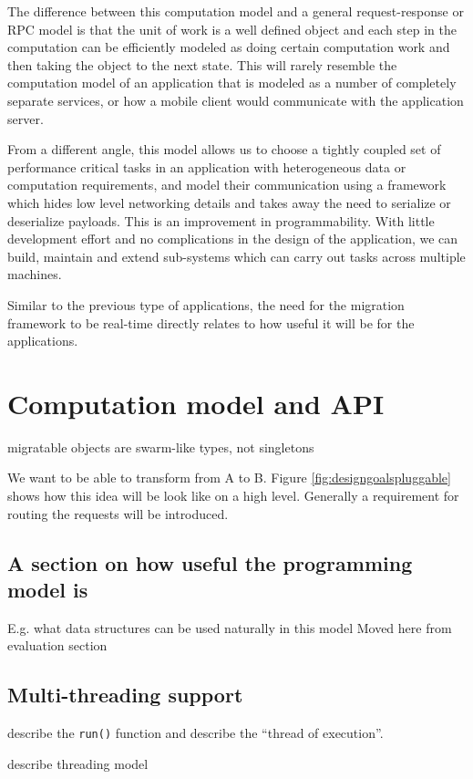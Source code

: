 The difference between this computation model and a general
request-response or RPC model is that the unit of work is a
well defined object and each step in the computation can be
efficiently modeled as doing certain computation work and then taking
the object to the next state. This will rarely resemble the computation
model of an application that is modeled as a number of completely separate
services, or how a mobile client would communicate with the application
server.

From a different angle, this model allows us to choose a tightly
coupled set of performance critical tasks in an application with
heterogeneous data or computation requirements, and model their
communication using a framework which hides low level networking details
and takes away the need to serialize or deserialize payloads.
This is an improvement in programmability. With little development
effort and no complications in the design of the application,
we can build, maintain and
extend sub-systems which can carry out tasks across multiple machines.

Similar to the previous type of applications, the need for the migration
framework to be real-time directly relates to how useful it will be for
the applications.


\section{Computation model and API}
\label{sec:api}
migratable objects are swarm-like types, not singletons

We want to be able to transform from A to B. Figure
\ref{fig:designgoalspluggable} shows how this idea will be look like on a high
level. Generally a requirement for routing the requests will be introduced.


\subsection{A section on how useful the programming model is}
E.g. what data structures can be used naturally in this model
Moved here from evaluation section
\subsection{Multi-threading support}

describe the \texttt{run()} function and describe the ``thread of execution''.

describe threading model

